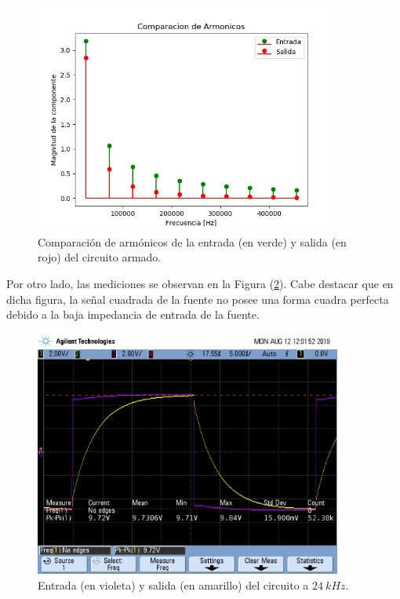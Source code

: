 \documentclass[a4paper]{article}
\begin{document}
\begin{figure}[H]
	\centering
	\includegraphics[width=0.9\textwidth]{ComparacionDeArmionicos}
\caption{Comparación de armónicos de la entrada (en verde) y salida (en rojo) del circuito armado.}
	\label{fig:armonicoscomparacion}
\end{figure}

Por otro lado, las mediciones se observan en la Figura (\ref{fig:medicion2}). Cabe destacar que en dicha figura, la señal cuadrada de la fuente no posee una forma cuadra perfecta debido a la baja impedancia de entrada de la fuente.

\begin{figure}[H]
	\centering
	\includegraphics[width=0.9\textwidth , trim={0.7cm 6.25cm  0 3.5cm},clip]{scope_1}
\caption{Entrada (en violeta) y salida (en amarillo) del circuito a $ 24 \ kHz $.}
	\label{fig:medicion2}
\end{figure}
\end{document}

